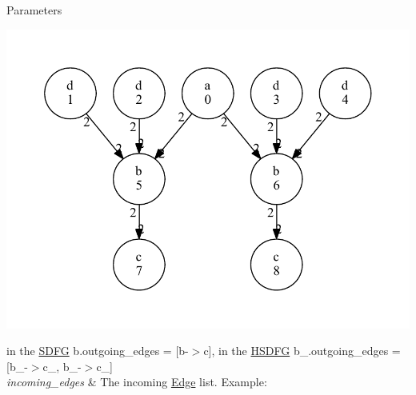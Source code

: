 \begin{DoxyParams}{Parameters}
\begin{DoxyImage}
\includegraphics[width=\textwidth,height=\textheight/2,keepaspectratio=true]{dot_HSDFG_example}
\end{DoxyImage}
 in the \hyperlink{classsylva_1_1base_1_1sdf_1_1_s_d_f_g}{S\+D\+FG} b.\+outgoing\+\_\+edges = \mbox{[}b-\/$>$c\mbox{]}, in the \hyperlink{classsylva_1_1base_1_1sdf_1_1_h_s_d_f_g}{H\+S\+D\+FG} b\+\_.\+outgoing\+\_\+edges = \mbox{[}b\+\_-\/$>$c\+\_, b\+\_-\/$>$c\+\_\mbox{]} \\
\hline
{\em incoming\+\_\+edges} & The incoming \hyperlink{classsylva_1_1base_1_1sdf_1_1_edge}{Edge} list. Example\+: 
\begin{DoxyImage}

\end{DoxyImage}
\end{DoxyParams}
